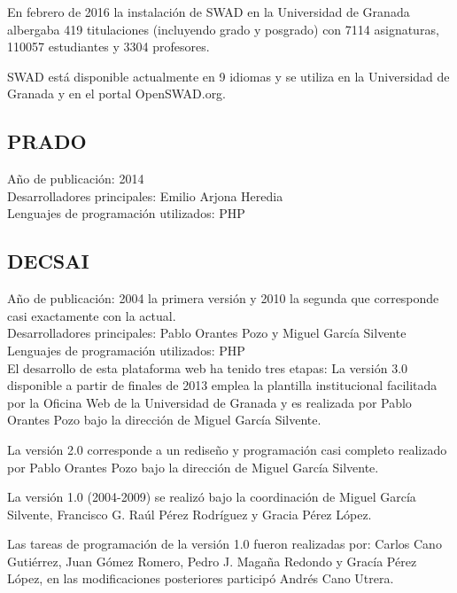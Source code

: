\bigskip
En febrero de 2016 la instalación de SWAD en la Universidad de Granada albergaba 419 titulaciones (incluyendo grado y posgrado) con 7114 asignaturas, 110057 estudiantes y 3304 profesores.

\bigskip
SWAD está disponible actualmente en 9 idiomas y se utiliza en la Universidad de Granada y en el portal OpenSWAD.org.

\subsection{PRADO}

Año de publicación: 2014\\

Desarrolladores principales: Emilio Arjona Heredia\\

Lenguajes de programación utilizados: PHP\\

\subsection{DECSAI}

Año de publicación: 2004 la primera versión y 2010 la segunda que corresponde casi exactamente con la actual.\\

Desarrolladores principales: Pablo Orantes Pozo y Miguel García Silvente\\

Lenguajes de programación utilizados: PHP\\

\bigskip
El desarrollo de esta plataforma web ha tenido tres etapas: 
La versión 3.0 disponible a partir de finales de 2013 emplea la plantilla institucional facilitada por la Oficina Web de la Universidad de Granada y es realizada por Pablo Orantes Pozo bajo la dirección de Miguel García Silvente.

\bigskip
La versión 2.0 corresponde a un rediseño y programación casi completo realizado por Pablo Orantes Pozo bajo la dirección de Miguel García Silvente.

\bigskip
La versión 1.0 (2004-2009) se realizó bajo la coordinación de Miguel García Silvente, Francisco G. Raúl Pérez Rodríguez y Gracia Pérez López.

\bigskip
Las tareas de programación de la versión 1.0 fueron realizadas por: Carlos Cano Gutiérrez, Juan Gómez Romero, Pedro J. Magaña Redondo y Gracía Pérez López, en las modificaciones posteriores participó Andrés Cano Utrera.

